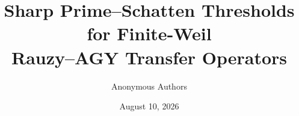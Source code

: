 \documentclass[11pt]{article}
\title{Sharp Prime--Schatten Thresholds for Finite-Weil\\
Rauzy--AGY Transfer Operators}
\author{Anonymous Authors}
\date{August 10, 2026}
\begin{document}
\maketitle

\begin{abstract}

\end{abstract}











\appendix




\end{document}
